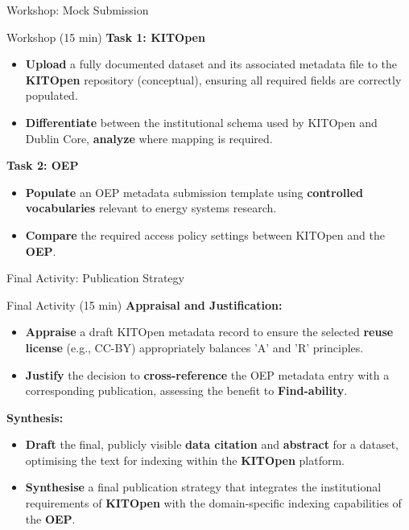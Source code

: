 \documentclass{integrity} %
\begin{document}
\begin{frame}{Workshop: Mock Submission}
    \begin{block}{Workshop (15 min)}
        \textbf{Task 1: KITOpen}
        \begin{itemize}
            \item \textbf{Upload} a fully documented dataset and its associated metadata file to the \textbf{KITOpen} repository (conceptual), ensuring all required fields are correctly populated.
            \item \textbf{Differentiate} between the institutional schema used by KITOpen and Dublin Core, \textbf{analyze} where mapping is required.
        \end{itemize}
        \pause
        \textbf{Task 2: OEP}
        \begin{itemize}
            \item \textbf{Populate} an OEP metadata submission template using \textbf{controlled vocabularies} relevant to energy systems research.
            \item \textbf{Compare} the required access policy settings between KITOpen and the \textbf{OEP}.
        \end{itemize}
    \end{block}
\end{frame}

\begin{frame}{Final Activity: Publication Strategy}
    \begin{block}{Final Activity (15 min)}
        \textbf{Appraisal and Justification:}
        \begin{itemize}
            \item \textbf{Appraise} a draft KITOpen metadata record to ensure the selected \textbf{reuse license} (e.g., CC-BY) appropriately balances 'A' and 'R' principles.
            \item \textbf{Justify} the decision to \textbf{cross-reference} the OEP metadata entry with a corresponding publication, assessing the benefit to \textbf{Find-ability}.
        \end{itemize}
        \pause
        \textbf{Synthesis:}
        \begin{itemize}
            \item \textbf{Draft} the final, publicly visible \textbf{data citation} and \textbf{abstract} for a dataset, optimising the text for indexing within the \textbf{KITOpen} platform.
            \item \textbf{Synthesise} a final publication strategy that integrates the institutional requirements of \textbf{KITOpen} with the domain-specific indexing capabilities of the \textbf{OEP}.
        \end{itemize}
    \end{block}
\end{frame}
\end{document}
